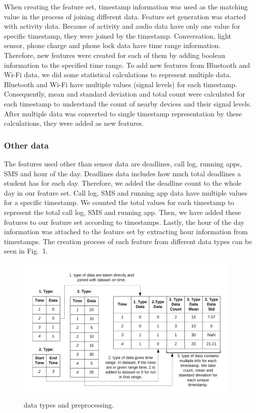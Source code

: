 \documentclass[3p,times,procedia]{elsarticle}
\begin{document}
When creating the feature set, timestamp information was used as the matching value in the process of joining different data. Feature set generation was started with activity data. Because of activity and audio data have only one value for specific timestamp, they were joined by the timestamp. Conversation, light sensor, phone charge and phone lock data have time range information. Therefore, new features were created for each of them by adding boolean information to the specified time range. To add new features from Bluetooth and Wi-Fi data, we did some statistical calculations to represent multiple data. Bluetooth and Wi-Fi have multiple values (signal levels) for each timestamp. Consequently, mean and standard deviation and total count were calculated for each timestamp to understand the count of nearby devices and their signal levels. After multiple data was converted to single timestamp representation by these calculations, they were added as new features.

\subsubsection{Other data}
The features used other than sensor data are deadlines, call log, running apps, SMS and hour of the day. Deadlines data includes how much total deadlines a student has for each day. Therefore, we added the deadline count to the whole day in our feature set. Call log, SMS and running app data have multiple values for a specific timestamp. We counted the total values for each timestamp to represent the total call log, SMS and running app. Then, we have added these features to our feature set according to timestamps. Lastly, the hour of the day information was attached to the feature set by extracting hour information from timestamps. The creation process of each feature from different data types can be seen in Fig.~1.

\begin{figure}[t]\vspace*{4pt}
\centerline{\includegraphics[width=110mm]{graphics/Dataset_Preparation.png}}
\caption{data types and preprocessing.}
\end{figure}
\end{document}
